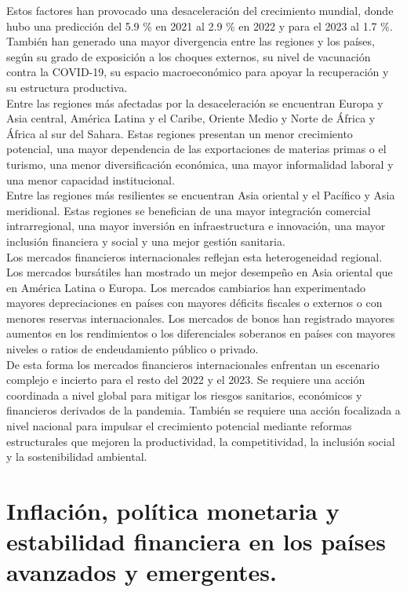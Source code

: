\documentclass{article}
\theoremstyle{mytheoremstyle}
\theoremstyle{mytheoremstyle}
\theoremstyle{myproblemstyle}
\begin{document}
Estos factores han provocado una desaceleración del crecimiento mundial, donde hubo una predicción del 5.9 \% en 2021 al 2.9 \% en 2022 y para el 2023 al 1.7 \%. También han generado una mayor divergencia entre las regiones y los países, según su grado de exposición a los choques externos, su nivel de vacunación contra la COVID-19, su espacio macroeconómico para apoyar la recuperación y su estructura productiva.\\

Entre las regiones más afectadas por la desaceleración se encuentran Europa y Asia central, América Latina y el Caribe, Oriente Medio y Norte de África y África al sur del Sahara. Estas regiones presentan un menor crecimiento potencial, una mayor dependencia de las exportaciones de materias primas o el turismo, una menor diversificación económica, una mayor informalidad laboral y una menor capacidad institucional.\\

Entre las regiones más resilientes se encuentran Asia oriental y el Pacífico y Asia meridional. Estas regiones se benefician de una mayor integración comercial intrarregional, una mayor inversión en infraestructura e innovación, una mayor inclusión financiera y social y una mejor gestión sanitaria.\\

Los mercados financieros internacionales reflejan esta heterogeneidad regional. Los mercados bursátiles han mostrado un mejor desempeño en Asia oriental que en América Latina o Europa. Los mercados cambiarios han experimentado mayores depreciaciones en países con mayores déficits fiscales o externos o con menores reservas internacionales. Los mercados de bonos han registrado mayores aumentos en los rendimientos o los diferenciales soberanos en países con mayores niveles o ratios de endeudamiento público o privado.\\

De esta forma los mercados financieros internacionales enfrentan un escenario complejo e incierto para el resto del 2022 y el 2023. Se requiere una acción coordinada a nivel global para mitigar los riesgos sanitarios, económicos y financieros derivados de la pandemia. También se requiere una acción focalizada a nivel nacional para impulsar el crecimiento potencial mediante reformas estructurales que mejoren la productividad, la competitividad, la inclusión social y la sostenibilidad ambiental.\\

\section{Inflación, política monetaria y estabilidad financiera en los países avanzados y emergentes.}
\end{document}
